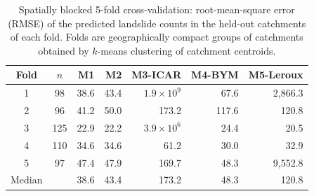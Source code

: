 \begin{table}[h]
\caption{Spatially blocked 5-fold cross-validation: root-mean-square error (RMSE) of the predicted landslide counts in the held-out catchments of each fold. Folds are geographically compact groups of catchments obtained by $k$-means clustering of catchment centroids.}\label{tabA4}
\footnotesize
\begin{tabular}{@{}ccrrrrr@{}}
\toprule
Fold & $n$ & M1 & M2 & M3-ICAR & M4-BYM & M5-Leroux \\
\midrule
1 & 98 & 38.6 & 43.4 & $1.9 \times 10^{9}$ & 67.6 & 2,866.3 \\
2 & 96 & 41.2 & 50.0 & 173.2 & 117.6 & 120.8 \\
3 & 125 & 22.9 & 22.2 & $3.9 \times 10^{6}$ & 24.4 & 20.5 \\
4 & 110 & 34.6 & 34.6 & 61.2 & 30.0 & 32.9 \\
5 & 97 & 47.4 & 47.9 & 169.7 & 48.3 & 9,552.8 \\
\midrule
Median & & 38.6 & 43.4 & 173.2 & 48.3 & 120.8 \\
\bottomrule
\end{tabular}
\end{table}
